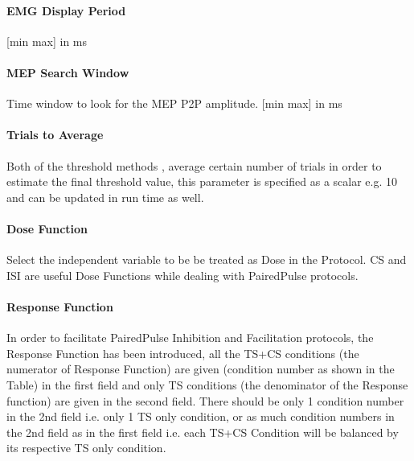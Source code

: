 \documentclass[letterpaper,10pt,english]{sphinxmanual}
\begin{document}
\paragraph{EMG Display Period}
\label{\detokenize{8_MEPDoseResponseCurve:emg-display-period}}
\sphinxAtStartPar
{[}min max{]} in ms


\paragraph{MEP Search Window}
\label{\detokenize{8_MEPDoseResponseCurve:mep-search-window}}
\sphinxAtStartPar
Time window to look for the MEP P2P amplitude. {[}min max{]} in ms


\paragraph{Trials to Average}
\label{\detokenize{8_MEPDoseResponseCurve:trials-to-average}}
\sphinxAtStartPar
Both of the threshold methods , average certain number of trials in order to estimate the final threshold value, this parameter is specified as a scalar e.g. 10 and can be updated in run time as well.


\paragraph{Dose Function}
\label{\detokenize{8_MEPDoseResponseCurve:dose-function}}
\sphinxAtStartPar
Select the independent variable to be be treated as Dose in the Protocol. CS and ISI are useful Dose Functions while dealing with Paired\sphinxhyphen{}Pulse protocols.


\paragraph{Response Function}
\label{\detokenize{8_MEPDoseResponseCurve:response-function}}
\sphinxAtStartPar
In order to facilitate Paired\sphinxhyphen{}Pulse Inhibition and Facilitation protocols, the Response Function has been introduced, all the TS+CS conditions (the numerator of Response Function) are given (condition number as shown in the Table) in the first field and only TS conditions (the denominator of the Response function) are given in the second field. There should be only 1 condition number in the 2nd field i.e. only 1 TS only condition, or as much condition numbers in the 2nd field as in the first field i.e. each TS+CS Condition will be balanced by its respective TS only condition.
\end{document}
